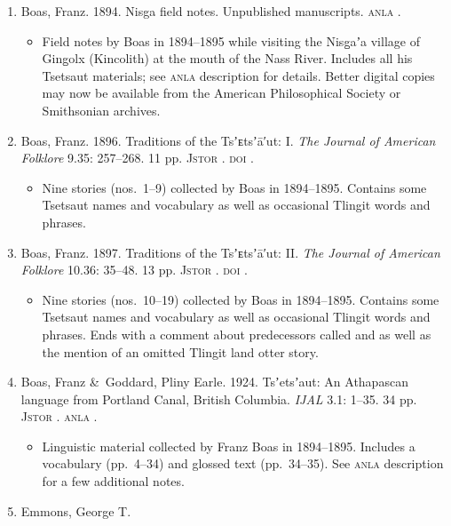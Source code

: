 \documentclass[12pt,letterpaper,oneside,article]{memoir}
\begin{document}
\begin{enumerate}
\item	Boas, Franz.
	1894.
	Nisga field notes.
	Unpublished manuscripts.
	\textsc{anla} .
	\begin{itemize}
	\item	Field notes by Boas in 1894–1895 while visiting the Nisg̱aʼa village of
		Ging̱olx (Kincolith) at the mouth of the Nass River.
		Includes all his Tsetsaut materials; see \textsc{anla} description for details.
		Better digital copies may now be available from the American Philosophical
		Society or Smithsonian archives.
	\end{itemize}
\item	Boas, Franz.
	1896.
	Traditions of the Tsʼᴇtsʼā′ut: I.
	\textit{The Journal of American Folklore} 9.35: 257–268.
	11 pp.
	\textsc{Jstor} .
	\textsc{doi} .
	\begin{itemize}
	\item	Nine stories (nos.\ 1–9) collected by Boas in 1894–1895.
		Contains some Tsetsaut names and vocabulary as well as occasional Tlingit
		words and phrases.
	\end{itemize}
\item	Boas, Franz.
	1897.
	Traditions of the Tsʼᴇtsʼā′ut: II.
	\textit{The Journal of American Folklore} 10.36: 35–48.
	13 pp.
	\textsc{Jstor} .
	\textsc{doi} .
	\begin{itemize}
	\item	Nine stories (nos.\ 10–19) collected by Boas in 1894–1895.
		Contains some Tsetsaut names and vocabulary as well as occasional Tlingit
		words and phrases.
		Ends with a comment about predecessors called  and 
		as well as the mention of an omitted Tlingit land otter story.
	\end{itemize}
\item	Boas, Franz \&\ Goddard, Pliny Earle.
	1924.
	Tsʼetsʼaut: An Athapascan language from Portland Canal, British Columbia.
	\textit{IJAL} 3.1: 1–35.
	34 pp.
	\textsc{Jstor} .
	\textsc{anla} .
	\begin{itemize}
	\item	Linguistic material collected by Franz Boas in 1894–1895.
		Includes a vocabulary (pp.\ 4–34) and glossed text (pp.\ 34–35).
		See \textsc{anla} description for a few additional notes.
	\end{itemize}
\item	Emmons, George T.

\end{enumerate}
\end{document}

